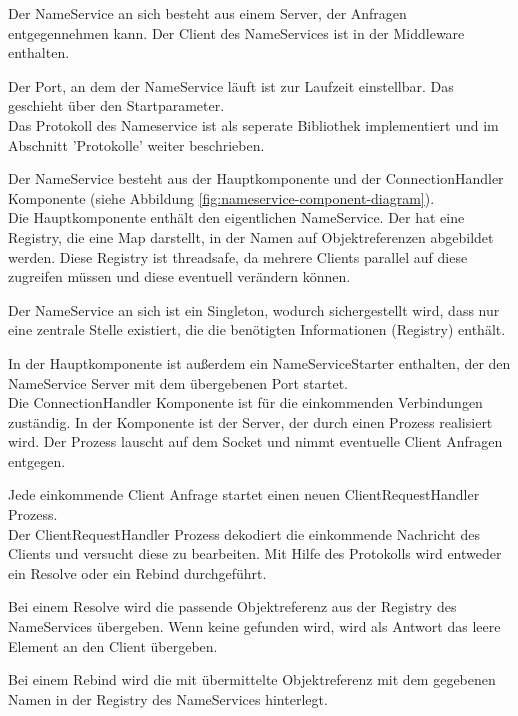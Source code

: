 \documentclass{article}
\begin{document}
Der NameService an sich besteht aus einem Server, der Anfragen entgegennehmen kann.
Der Client des NameServices ist in der Middleware enthalten.

Der Port, an dem der NameService läuft ist zur Laufzeit einstellbar. Das geschieht über den Startparameter.\\

Das Protokoll des Nameservice ist als seperate Bibliothek implementiert und im Abschnitt
'Protokolle' weiter beschrieben.

Der NameService besteht aus der Hauptkomponente und der ConnectionHandler Komponente (siehe Abbildung
\ref{fig:nameservice-component-diagram}).\\

Die Hauptkomponente enthält den eigentlichen NameService. Der hat eine Registry, die eine Map darstellt, in der Namen
auf Objektreferenzen abgebildet werden. Diese Registry ist threadsafe, da mehrere Clients parallel auf diese
zugreifen müssen und diese eventuell verändern können.

Der NameService an sich ist ein Singleton, wodurch sichergestellt wird, dass nur eine zentrale Stelle existiert, die
die benötigten Informationen (Registry) enthält.

In der Hauptkomponente ist außerdem ein NameServiceStarter enthalten, der den NameService Server mit dem übergebenen
Port startet.\\

Die ConnectionHandler Komponente ist für die einkommenden Verbindungen zuständig. In der Komponente ist der Server, der
durch einen Prozess realisiert wird. Der Prozess lauscht auf dem Socket und nimmt eventuelle Client Anfragen entgegen.

Jede einkommende Client Anfrage startet einen neuen ClientRequestHandler Prozess.\\

Der ClientRequestHandler Prozess dekodiert die einkommende Nachricht des Clients und versucht diese zu bearbeiten.
Mit Hilfe des Protokolls wird entweder ein Resolve oder ein Rebind durchgeführt.

Bei einem Resolve wird die passende Objektreferenz aus der Registry des NameServices übergeben. Wenn keine gefunden
wird, wird als Antwort das leere Element an den Client übergeben.

Bei einem Rebind wird die mit übermittelte Objektreferenz mit dem gegebenen Namen in der Registry des NameServices
hinterlegt.\\
\end{document}
